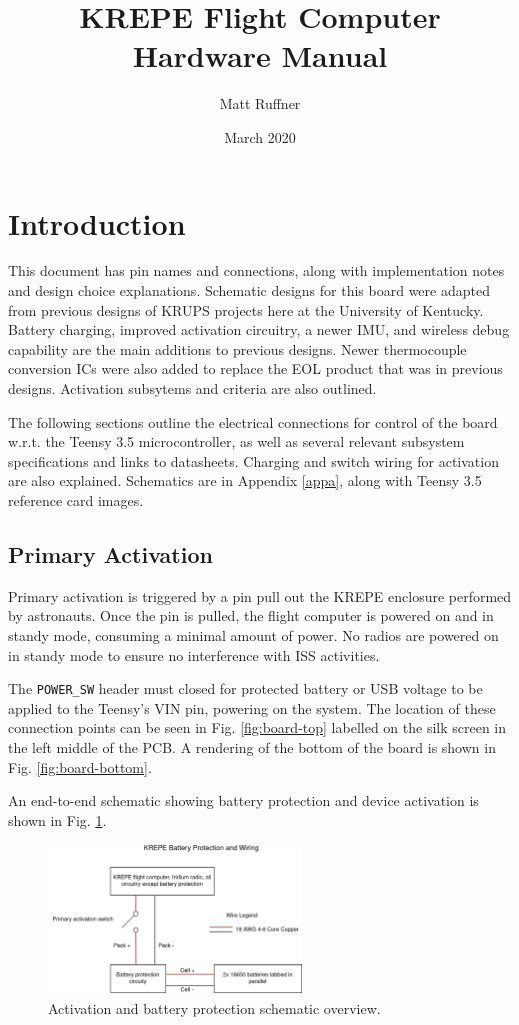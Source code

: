 \documentclass{article}
\title{KREPE Flight Computer Hardware Manual}
\author{Matt Ruffner}
\date{March 2020}
\begin{document}
\maketitle
\tableofcontents
\newpage
\listoffigures
\listoftables
\newpage

\section{Introduction}

This document has pin names and connections, along with implementation notes and design choice explanations. Schematic designs for this board were adapted from previous designs of KRUPS projects here at the University of Kentucky. Battery charging, improved activation circuitry, a newer IMU, and wireless debug capability are the main additions to previous designs. Newer thermocouple conversion ICs were also added to replace the EOL product that was in previous designs. Activation subsytems and criteria are also outlined.

The following sections outline the electrical connections for control of the board w.r.t. the Teensy 3.5 microcontroller, as well as several relevant subsystem specifications and links to datasheets. Charging and switch wiring for activation are also explained. Schematics are in Appendix \ref{appa}, along with Teensy 3.5 reference card images.

\subsection{Primary Activation}
Primary activation is triggered by a pin pull out the KREPE enclosure performed by astronauts. Once the pin is pulled, the flight computer is powered on and in standy mode, consuming a minimal amount of power. No radios are powered on in standy mode to ensure no interference with ISS activities. 

The \texttt{POWER\_SW} header must closed for protected battery or USB voltage to be applied to the Teensy's VIN pin, powering on the system. The location of these connection points can be seen in Fig. \ref{fig:board-top} labelled on the silk screen in the left middle of the PCB. A rendering of the bottom of the board is shown in Fig. \ref{fig:board-bottom}.

An end-to-end schematic showing battery protection and device activation is shown in Fig. \ref{fig:activation-circuitry}.

\begin{figure}[H]
    \centering
    \includegraphics[width=0.6\textwidth]{images/krepe-electrical-overview.png}
    \caption{Activation and battery protection schematic overview.}
    \label{fig:activation-circuitry}
\end{figure}
\end{document}
